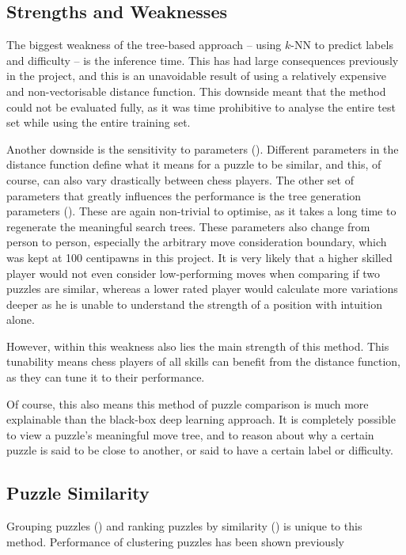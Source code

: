 \subsection{Strengths and Weaknesses}\label{evalS41}

The biggest weakness of the tree-based approach -- using $k$-NN to predict
labels and difficulty -- is the inference time. This has had large consequences
previously in the project, and this is an unavoidable result of using a
relatively expensive and non-vectorisable distance function. This downside
meant that the method could not be evaluated fully, as it was time prohibitive
to analyse the entire test set while using the entire training set.

Another downside is the sensitivity to parameters (). Different
parameters in the distance function define what it means for a puzzle to be
similar, and this, of course, can also vary drastically between chess players.
The other set of parameters that greatly influences the performance is the tree
generation parameters (). These are again non-trivial to
optimise, as it takes a long time to regenerate the meaningful search trees.
These parameters also change from person to person, especially the arbitrary
move consideration boundary, which was kept at 100 centipawns in this project.
It is very likely that a higher skilled player would not even consider
low-performing moves when comparing if two puzzles are similar, whereas a lower
rated player would calculate more variations deeper as he is unable to
understand the strength of a position with intuition alone.

However, within this weakness also lies the main strength of this method. This
tunability means chess players of all skills can benefit from the distance
function, as they can tune it to their performance.

Of course, this also means this method of puzzle comparison is much more
explainable than the black-box deep learning approach. It is completely
possible to view a puzzle's meaningful move tree, and to reason about why a
certain puzzle is said to be close to another, or said to have a certain label
or difficulty.

\subsection{Puzzle Similarity}\label{evalS42}

Grouping puzzles () and ranking puzzles by similarity
() is unique to this method. Performance of clustering puzzles
has been shown previously 

